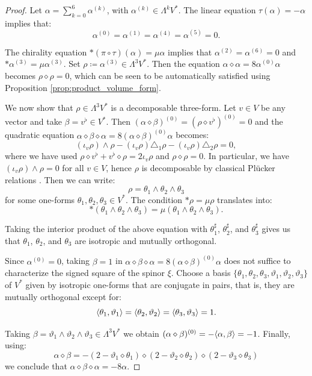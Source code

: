 \documentclass[10pt,reqno]{amsart}
\theoremstyle{definition}
\theoremstyle{remark}
\DeclarePairedDelimiter{\escal}{\langle}{\rangle}
\begin{document}
\begin{proof}
    Let $\alpha=\sum_{k=0}^6\alpha^{(k)}$, with $\alpha^{(k)}\in\Lambda^kV^*$. The linear equation $\tau(\alpha)=-\alpha$ implies that: $$\alpha^{(0)}=\alpha^{(1)}=\alpha^{(4)}=\alpha^{(5)}=0.$$
    
    The chirality equation $*(\pi\circ\tau)(\alpha)=\mu\alpha$ implies that $\alpha^{(2)}=\alpha^{(6)}=0$ and $*\alpha^{(3)}=\mu\alpha^{(3)}$. Set $\rho\coloneqq\alpha^{(3)}\in\Lambda^3V^*$. Then the equation $\alpha\diamond\alpha=8\alpha^{(0)}\alpha$ becomes $\rho\diamond\rho=0$, which can be seen to be automatically satisfied using Proposition \ref{prop:product_volume_form}.\medskip
    
    We now show that $\rho\in\Lambda^3V^*$ is a decomposable three-form. Let $v\in V$ be any vector and take $\beta=v^\flat\in V^*$. Then $(\alpha\diamond\beta)^{(0)}=(\rho\diamond v^\flat)^{(0)}=0$ and the quadratic equation $\alpha\diamond\beta\diamond\alpha=8(\alpha\diamond\beta)^{(0)}\alpha$ becomes: $$(\iota_v\rho)\wedge\rho-(\iota_v\rho)\triangle_1\rho-(\iota_v\rho)\triangle_2\rho=0,$$ where we have used $\rho\diamond v^\flat+v^\flat\diamond\rho=2\iota_v\rho$ and $\rho\diamond\rho=0$. In particular, we have $(\iota_v\rho)\wedge\rho=0$ for all $v\in V$, hence $\rho$ is decomposable by classical Plücker relations \cite{Eastwood_Michor2000}. Then we can write: $$\rho=\theta_1\wedge\theta_2\wedge\theta_3$$ for some one-forms $\theta_1,\theta_2,\theta_3\in V^*$. The condition $*\rho=\mu\rho$ translates into: $$*(\theta_1\wedge\theta_2\wedge\theta_3)=\mu(\theta_1\wedge\theta_2\wedge\theta_3).$$
    
    Taking the interior product of the above equation with $\theta_1^\sharp$, $\theta_2^\sharp$, and $\theta_3^\sharp$ gives us that $\theta_1$, $\theta_2$, and $\theta_3$ are isotropic and mutually orthogonal.\medskip

    Since $\alpha^{(0)}=0$, taking $\beta=1$ in $\alpha\diamond\beta\diamond\alpha=8(\alpha\diamond\beta)^{(0)}\alpha$ does not suffice to characterize the signed square of the spinor $\xi$. Choose a basis $\{\theta_1,\theta_2,\theta_3,\vartheta_1,\vartheta_2,\vartheta_3\}$ of $V^*$ given by isotropic one-forms that are conjugate in pairs, that is, they are mutually orthogonal except for: $$\escal{\theta_1,\vartheta_1}=\escal{\theta_2,\vartheta_2}=\escal{\theta_3,\vartheta_3}=1.$$
    
    Taking $\beta=\vartheta_1\wedge\vartheta_2\wedge\vartheta_3\in\Lambda^3V^*$ we obtain $(\alpha\diamond\beta)^{(0)}=-\escal{\alpha,\beta}=-1$. Finally, using: $$\alpha\diamond\beta=-(2-\vartheta_1\diamond\theta_1)\diamond(2-\vartheta_2\diamond\theta_2)\diamond(2-\vartheta_3\diamond\theta_3)$$ we conclude that $\alpha\diamond\beta\diamond\alpha=-8\alpha$.
\end{proof}
\end{document}
